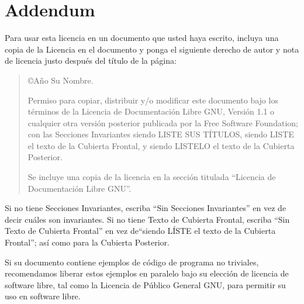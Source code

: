 \section{Addendum}

Para  usar esta  licencia  en  un documento  que  usted haya  escrito,
incluya una copia de la Licencia  en el documento y ponga el siguiente
derecho de  autor y nota  de licencia justo  después del título  de la
página:

\begin{quote}

	\copyright  Año  Su Nombre.

	Permiso para copiar, distribuir y/o modificar este documento
        bajo los términos de  la Licencia  de Documentación Libre  GNU,
        Versión  1.1 o cualquier  otra  versión posterior  publicada
        por  la Free  Software	Foundation; con  las Secciones Invariantes
        siendo LISTE SUS TÍTULOS, siendo LISTE  el texto de la  Cubierta
        Frontal,  y siendo LISTELO el texto de la Cubierta Posterior.

	Se incluye una  copia  de  la  licencia  en  la  sección  titulada
	``Licencia de Documentación Libre GNU''.

\end{quote}

Si   no  tiene   Secciones   Invariantes,   escriba  ``Sin   Secciones
Invariantes''  en vez  de decir  cuáles son  invariantes. Si  no tiene
Texto de Cubierta  Frontal, escriba ``Sin Texto  de Cubierta Frontal''
en vez  de``siendo LÍSTE el texto  de la Cubierta Frontal'';  así como
para la Cubierta Posterior.

Si su documento contiene ejemplos  de código de programa no triviales,
recomendamos liberar  estos ejemplos en  paralelo bajo su  elección de
licencia de  software libre, tal  como la Licencia de  Público General
GNU, para permitir su uso en software libre.

